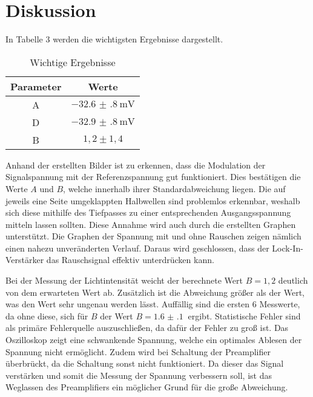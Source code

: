\section{Diskussion}
\label{sec:Diskussion}

In Tabelle 3 werden die wichtigsten Ergebnisse dargestellt.
\begin{table}[H]
  \centering
  \caption{Wichtige Ergebnisse}
  \label{tab:Phase}
  \begin{tabular}{c c}
    \toprule
    Parameter & Werte \\
    \midrule
    A & $\SI{-32.6(8)}{\milli\volt}$ \\
    D & $\SI{-32.9(8)}{\milli\volt}$ \\
    B & $1,2 \pm 1,4$ \\
    \bottomrule
  \end{tabular}
\end{table}



Anhand der erstellten Bilder ist zu erkennen, dass die Modulation der Signalspannung mit der Referenzspannung gut funktioniert. Dies bestätigen
die Werte $A$ und $B$, welche innerhalb ihrer Standardabweichung liegen.
Die auf jeweils eine Seite umgeklappten Halbwellen sind problemlos erkennbar, weshalb sich diese mithilfe des
Tiefpasses zu einer entsprechenden Ausgangsspannung mitteln lassen sollten. Diese Annahme wird auch durch die erstellten
Graphen unterstützt.
Die Graphen der Spannung mit und ohne Rauschen zeigen nämlich einen nahezu unveränderten Verlauf. Daraus wird geschlossen, dass der
Lock-In-Verstärker das Rauschsignal effektiv unterdrücken kann.

Bei der Messung der Lichtintensität weicht der berechnete Wert $B=1,2$ deutlich von dem erwarteten Wert ab. Zusätzlich ist die Abweichung
größer als der Wert, was den Wert sehr ungenau werden lässt.
Auffällig sind die ersten 6 Messwerte, da ohne diese, sich für $B$ der Wert $B= \SI{1.6(1)}{}$ ergibt. Statistische Fehler sind
als primäre Fehlerquelle auszuschließen, da dafür der Fehler zu groß ist. Das Oszilloskop zeigt eine schwankende Spannung, welche
ein optimales Ablesen der Spannung nicht ermöglicht. Zudem wird bei Schaltung der Preamplifier überbrückt, da die Schaltung sonst nicht
funktioniert. Da dieser das Signal verstärken und somit die Messung der Spannung verbessern soll, ist das Weglassen des
Preamplifiers ein möglicher Grund für die große Abweichung.
